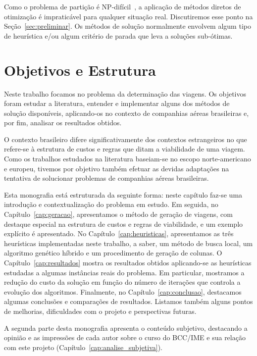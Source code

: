 Como o problema de partição é NP-difícil~\cite{garey79}, a aplicação de métodos diretos de
otimização é impraticável para qualquer situação real. Discutiremos esse ponto na
Seção~\ref{sec:preliminar}. Os métodos de solução normalmente envolvem algum tipo de heurística e/ou
algum critério de parada que leva a soluções sub-ótimas.


\section{Objetivos e Estrutura}
\label{sec:objetivos}

Neste trabalho focamos no problema da determinação das viagens. Os objetivos foram estudar a 
literatura, entender e implementar alguns dos métodos de solução disponíveis, aplicando-os
no contexto de companhias aéreas brasileiras e, por fim, analisar os resultados obtidos.

O contexto brasileiro difere significativamente dos contextos estrangeiros no que refere-se à 
estrutura de custos e regras que ditam a viabilidade de uma viagem. Como os trabalhos estudados na
literatura baseiam-se no escopo norte-americano e europeu, tivemos por objetivo também efetuar as 
devidas adaptações na tentativa de solucionar problemas de companhias aéreas brasileiras.

Esta monografia está estruturada da seguinte forma: neste capítulo faz-se uma introdução e
contextualização do problema em estudo. Em seguida, no Capítulo~\ref{cap:geracao}, apresentamos o
método de geração de viagens, com destaque especial na estrutura de custos e regras de viabilidade,
e um exemplo explícito é apresentado. No Capítulo~\ref{cap:heuristicas}, apresentamos as três
heurísticas implementadas neste trabalho, a saber, um método de busca local, um algoritmo genético
híbrido e um procedimento de geração de colunas. O Capítulo~\ref{cap:resultados} mostra os
resultados obtidos aplicando-se as heurísticas estudadas a algumas instâncias reais do problema. Em
particular, mostramos a redução do custo da solução em função do número de iterações que controla a
evolução dos algoritmos. Finalmente, no Capítulo~\ref{cap:conclusao}, destacamos algumas conclusões
e comparações de resultados. Listamos também alguns pontos de melhorias, dificuldades com o projeto
e perspectivas futuras.

A segunda parte desta monografia apresenta o conteúdo subjetivo, destacando a opinião e as
impressões de cada autor sobre o curso do BCC/IME e sua relação com este projeto
(Capítulo~\ref{cap:analise_subjetiva}).